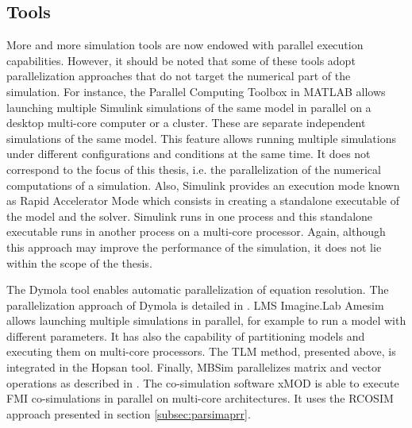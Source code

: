 \subsection{Tools}

More and more simulation tools are now endowed with parallel execution capabilities. However, it should be noted that some of these tools adopt parallelization approaches that do not target the numerical part of the simulation. For instance, the Parallel Computing Toolbox in MATLAB allows launching multiple Simulink simulations of the same model in parallel on a desktop multi-core computer or a cluster. These are separate independent simulations of the same model. This feature allows running multiple simulations under different configurations and conditions at the same time. It does not correspond to the focus of this thesis, i.e. the parallelization of the numerical computations of a simulation. Also, Simulink provides an execution mode known as Rapid Accelerator Mode which consists in creating a standalone executable of the model and the solver. Simulink runs in one process and this standalone executable runs in another process on a multi-core processor. Again, although this approach may improve the performance of the simulation, it does not lie within the scope of the thesis.

The Dymola tool enables automatic parallelization of equation resolution. The parallelization approach of Dymola is detailed in \cite{elmqvist:2014}. LMS Imagine.Lab Amesim allows launching multiple simulations in parallel, for example to run a model with different parameters. It has also the capability of partitioning models and executing them on multi-core processors. The TLM method, presented above, is integrated in the Hopsan tool. Finally, MBSim parallelizes matrix and vector operations as described in \cite{clauberg:2012}. The co-simulation software xMOD is able to execute FMI co-simulations in parallel on multi-core architectures. It uses the RCOSIM approach \cite{benkhaled:2014} presented in section \ref{subsec:parsimaprr}.  